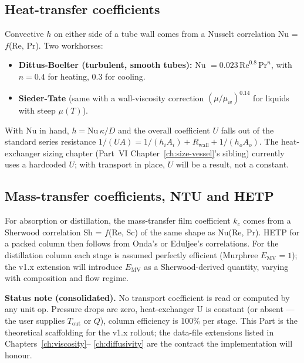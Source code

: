 \documentclass[11pt,a4paper]{article}
\begin{document}
\subsection{Heat-transfer coefficients}

Convective $h$ on either side of a tube wall comes from a Nusselt
correlation Nu = $f$(Re, Pr).  Two workhorses:
\begin{itemize}[leftmargin=*,nosep]
  \item \textbf{Dittus-Boelter (turbulent, smooth tubes):}
        Nu $= 0.023\,\mathrm{Re}^{0.8}\,\mathrm{Pr}^{n}$,
        with $n = 0.4$ for heating, $0.3$ for cooling.
  \item \textbf{Sieder-Tate} (same with a wall-viscosity correction
        $(\mu / \mu_w)^{0.14}$ for liquids with steep $\mu(T)$).
\end{itemize}
With Nu in hand, $h = \mathrm{Nu}\,\kappa / D$ and the overall
coefficient $U$ falls out of the standard series resistance
$1/(UA) = 1/(h_i A_i) + R_{\mathrm{wall}} + 1/(h_o A_o)$.  The
heat-exchanger sizing chapter
(Part~VI Chapter~\ref{ch:size-vessel}'s sibling) currently uses a
hardcoded $U$; with transport in place, $U$ will be a result, not a
constant.

\subsection{Mass-transfer coefficients, NTU and HETP}

For absorption or distillation, the mass-transfer film coefficient
$k_c$ comes from a Sherwood correlation Sh = $f$(Re, Sc) of the
same shape as Nu(Re, Pr).  HETP for a packed column then follows
from Onda's or Eduljee's correlations.  For the distillation
column  each stage is assumed perfectly efficient
(Murphree $E_{\mathrm{MV}} = 1$); the v1.x extension will
introduce $E_{\mathrm{MV}}$ as a Sherwood-derived quantity,
varying with composition and flow regime.

\begin{tutoriallink}
\textbf{Status note (consolidated).}  No transport coefficient is
read or computed by any unit op.  Pressure drops are zero,
heat-exchanger U is constant (or absent --- the user supplies
$T_{\mathrm{out}}$ or $Q$), column efficiency is 100\% per stage.
This Part is the theoretical scaffolding for the v1.x rollout; the
data-file extensions listed in Chapters~\ref{ch:viscosity}--%
\ref{ch:diffusivity} are the contract the implementation will
honour.
\end{tutoriallink}
\end{document}
